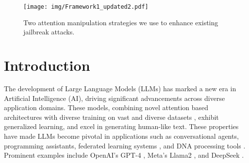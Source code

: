 

\begin{figure*}[ht]
    \centering
    \texttt{[image: img/Framework1\_updated2.pdf]}
    \caption{Two attention manipulation strategies we use to enhance existing jailbreak attacks.}
    \label{fig: General Framework}
\end{figure*}



\section{Introduction}

The development of Large Language Models (LLMs) has marked a new era in Artificial Intelligence (AI), driving significant advancements across diverse application domains. These models, combining novel attention based architectures with diverse training on vast and diverse datasets \cite{achiam2023gpt}, exhibit generalized learning, and excel in generating human-like text.  These properties have made LLMs become pivotal in applications such as conversational agents, programming assistants, federated learning systems \cite{gargary2024systematicreviewfederatedgenerative}, and DNA processing tools \cite{Sereshki2024.05.02.592257}. Prominent examples include OpenAI’s GPT-4 \cite{achiam2023gpt}, Meta’s Llama2 \cite{touvron2023llama}, and DeepSeek \cite{liu2024deepseek}.



